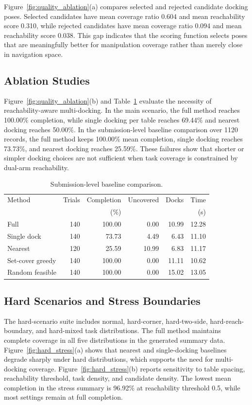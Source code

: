     Figure~\ref{fig:quality_ablation}(a) compares selected and rejected candidate docking poses. 
    Selected candidates have mean coverage ratio 0.604 and mean reachability score 0.310,
    while rejected candidates have mean coverage ratio 0.094 and mean reachability score 0.038. 
    This gap indicates that the scoring function selects poses that are meaningfully better for 
    manipulation coverage rather than merely close in navigation space.

\subsection{Ablation Studies}
Figure~\ref{fig:quality_ablation}(b) and Table~\ref{tab:baseline_submission} evaluate the necessity of reachability-aware multi-docking. 
In the main scenario, the full method reaches 100.00\% completion, while single docking per table reaches 69.44\% and nearest docking reaches 50.00\%. 
In the submission-level baseline comparison over 1120 records, the full method keeps 100.00\% mean completion, single docking reaches 73.73\%, 
and nearest docking reaches 25.59\%. 
These failures show that shorter or simpler docking choices are not sufficient when task coverage is constrained by dual-arm reachability.

\begin{table}[!t]
\centering
\caption{Submission-level baseline comparison.}
\label{tab:baseline_submission}
\footnotesize
\setlength{\tabcolsep}{3.2pt}
\begin{tabular}{@{}lrrrrr@{}}
\toprule
Method & Trials & Completion & Uncovered & Docks & Time \\
 & & (\%) & & & (s) \\
\midrule
Full & 140 & 100.00 & 0.00 & 10.99 & 12.28 \\
Single dock & 140 & 73.73 & 4.49 & 6.43 & 11.10 \\
Nearest & 120 & 25.59 & 10.99 & 6.83 & 11.17 \\
Set-cover greedy & 140 & 100.00 & 0.00 & 11.11 & 10.62 \\
Random feasible & 140 & 100.00 & 0.00 & 15.02 & 13.05 \\
\bottomrule
\end{tabular}
\end{table}

\subsection{Hard Scenarios and Stress Boundaries}
 The hard-scenario suite includes normal, hard-corner, hard-two-side, hard-reach-boundary, 
 and hard-mixed task distributions. The full method maintains complete coverage in all five distributions in the generated summary data. 
 Figure~\ref{fig:hard_stress}(a) shows that nearest and single-docking baselines degrade sharply under hard distributions, 
 which supports the need for multi-docking coverage.
 Figure~\ref{fig:hard_stress}(b) reports sensitivity to table spacing, reachability threshold, task density, and candidate density. 
 The lowest mean completion in the stress summary is 96.92\% at reachability threshold 0.5,
  while most settings remain at full completion.

